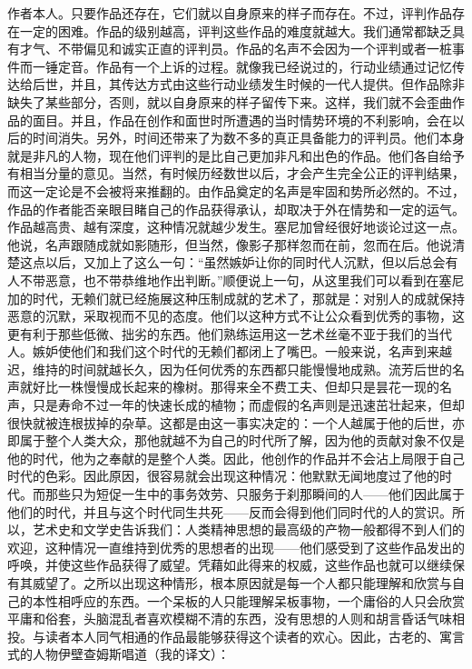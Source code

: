 \documentclass[12pt,oneside]{book}
\begin{document}
作者本人。只要作品还存在，它们就以自身原来的样子而存在。不过，评判作品存在一定的困难。作品的级别越高，评判这些作品的难度就越大。我们通常都缺乏具有才气、不带偏见和诚实正直的评判员。作品的名声不会因为一个评判或者一桩事件而一锤定音。作品有一个上诉的过程。就像我已经说过的，行动业绩通过记忆传达给后世，并且，其传达方式由这些行动业绩发生时候的一代人提供。但作品除非缺失了某些部分，否则，就以自身原来的样子留传下来。这样，我们就不会歪曲作品的面目。并且，作品在创作和面世时所遭遇的当时情势环境的不利影响，会在以后的时间消失。另外，时间还带来了为数不多的真正具备能力的评判员。他们本身就是非凡的人物，现在他们评判的是比自己更加非凡和出色的作品。他们各自给予有相当分量的意见。当然，有时候历经数世以后，才会产生完全公正的评判结果，而这一定论是不会被将来推翻的。由作品奠定的名声是牢固和势所必然的。不过，作品的作者能否亲眼目睹自己的作品获得承认，却取决于外在情势和一定的运气。作品越高贵、越有深度，这种情况就越少发生。塞尼加曾经很好地谈论过这一点。他说，名声跟随成就如影随形，但当然，像影子那样忽而在前，忽而在后。他说清楚这点以后，又加上了这么一句：“虽然嫉妒让你的同时代人沉默，但以后总会有人不带恶意，也不带恭维地作出判断。”顺便说上一句，从这里我们可以看到在塞尼加的时代，无赖们就已经施展这种压制成就的艺术了，那就是：对别人的成就保持恶意的沉默，采取视而不见的态度。他们以这种方式不让公众看到优秀的事物，这更有利于那些低微、拙劣的东西。他们熟练运用这一艺术丝毫不亚于我们的当代人。嫉妒使他们和我们这个时代的无赖们都闭上了嘴巴。一般来说，名声到来越迟，维持的时间就越长久，因为任何优秀的东西都只能慢慢地成熟。流芳后世的名声就好比一株慢慢成长起来的橡树。那得来全不费工夫、但却只是昙花一现的名声，只是寿命不过一年的快速长成的植物；而虚假的名声则是迅速茁壮起来，但却很快就被连根拔掉的杂草。这都是由这一事实决定的：一个人越属于他的后世，亦即属于整个人类大众，那他就越不为自己的时代所了解，因为他的贡献对象不仅是他的时代，他为之奉献的是整个人类。因此，他创作的作品并不会沾上局限于自己时代的色彩。因此原因，很容易就会出现这种情况：他默默无闻地度过了他的时代。而那些只为短促一生中的事务效劳、只服务于刹那瞬间的人——他们因此属于他们的时代，并且与这个时代同生共死——反而会得到他们同时代的人的赏识。所以，艺术史和文学史告诉我们：人类精神思想的最高级的产物一般都得不到人们的欢迎，这种情况一直维持到优秀的思想者的出现——他们感受到了这些作品发出的呼唤，并使这些作品获得了威望。凭藉如此得来的权威，这些作品也就可以继续保有其威望了。之所以出现这种情形，根本原因就是每一个人都只能理解和欣赏与自己的本性相呼应的东西。一个呆板的人只能理解呆板事物，一个庸俗的人只会欣赏平庸和俗套，头脑混乱者喜欢模糊不清的东西，没有思想的人则和胡言昏话气味相投。与读者本人同气相通的作品最能够获得这个读者的欢心。因此，古老的、寓言式的人物伊壁查姆斯唱道（我的译文）： 
\end{document}
